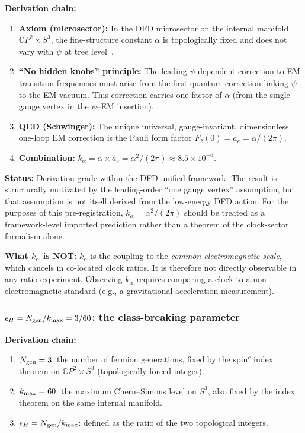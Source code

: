 \documentclass[twocolumn,showpacs,preprintnumbers,amsmath,amssymb,prd]{revtex4-2}
\newcommand{\kalpha}{k_\alpha}
\begin{document}
\textbf{Derivation chain:}
\begin{enumerate}
\item \textbf{Axiom (microsector):} In the DFD microsector on the
  internal manifold $\mathbb{C}P^2 \times S^3$, the fine-structure
  constant $\alpha$ is topologically fixed and does not vary with
  $\psi$ at tree level~\cite[App.~M]{Alcock2025_DFD_v32}.

\item \textbf{``No hidden knobs'' principle:} The leading
  $\psi$-dependent correction to EM transition frequencies must
  arise from the first quantum correction linking $\psi$ to the EM
  vacuum.  This correction carries one factor of $\alpha$ (from the
  single gauge vertex in the $\psi$--EM insertion).

\item \textbf{QED (Schwinger):} The unique universal, gauge-invariant,
  dimensionless one-loop EM correction is the Pauli form factor
  $F_2(0) = a_e = \alpha/(2\pi)$.

\item \textbf{Combination:} $\kalpha = \alpha \times a_e
  = \alpha^2/(2\pi) \approx 8.5 \times 10^{-6}$.
\end{enumerate}

\textbf{Status:} Derivation-grade within the DFD unified framework.
The result is structurally motivated by the leading-order
``one gauge vertex'' assumption, but that assumption is not itself
derived from the low-energy DFD action.  For the purposes of this
pre-registration, $\kalpha = \alpha^2/(2\pi)$ should be treated as a
framework-level imported prediction rather than a theorem of the
clock-sector formalism alone.

\textbf{What $\kalpha$ is NOT:} $\kalpha$ is the coupling to the
\emph{common electromagnetic scale}, which cancels in co-located
clock ratios.  It is therefore not directly observable in any
ratio experiment.  Observing $\kalpha$ requires comparing a clock
to a non-electromagnetic standard (e.g., a gravitational
acceleration measurement).

\subsubsection{$\epsilon_H = N_{\rm gen}/k_{\rm max} = 3/60$: the
class-breaking parameter}\label{sec:epsH-deriv}

\textbf{Derivation chain:}
\begin{enumerate}
\item $N_{\rm gen} = 3$: the number of fermion generations, fixed by
  the spin$^c$ index theorem on $\mathbb{C}P^2 \times S^3$
  (topologically forced integer).

\item $k_{\rm max} = 60$: the maximum Chern--Simons level on $S^3$,
  also fixed by the index theorem on the same internal manifold.

\item $\epsilon_H = N_{\rm gen}/k_{\rm max}$: defined as the ratio of
  the two topological integers.
\end{enumerate}
\end{document}
